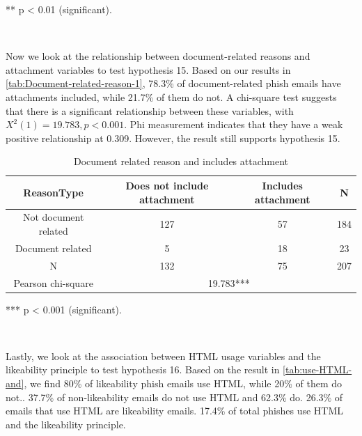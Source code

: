 {*}{*} p < 0.01 (significant).

\ 

Now we look at the relationship between document-related reasons and
attachment variables to test hypothesis 15. Based on our results in
\autoref{tab:Document-related-reason-1}, 78.3\% of document-related
phish emails have attachments included, while 21.7\% of them do not.
A chi-square test suggests that there is a significant relationship
between these variables, with $X^{2}(1)=19.783,p<0.001$. Phi measurement
indicates that they have a weak positive relationship at 0.309. However,
the result still supports hypothesis 15.

\begin{minipage}[t]{1\columnwidth}%
\begin{longtable}{cccc}
\caption{\label{tab:Document-related-reason-1}Document related reason and
includes attachment}
\tabularnewline
\toprule 
{\footnotesize{}ReasonType} & {\footnotesize{}Does not include attachment} & {\footnotesize{}Includes attachment} & \multirow{1}{*}{{\footnotesize{}N}}\tabularnewline
\midrule 
\multirow{1}{*}{{\footnotesize{}Not document related}} & {\footnotesize{}127} & {\footnotesize{}57} & \multirow{1}{*}{{\footnotesize{}184}}\tabularnewline
\midrule 
\multirow{1}{*}{{\footnotesize{}Document related}} & {\footnotesize{}5} & {\footnotesize{}18} & \multirow{1}{*}{{\footnotesize{}23}}\tabularnewline
\midrule 
{\footnotesize{}N} & {\footnotesize{}132} & {\footnotesize{}75} & {\footnotesize{}207}\tabularnewline
\midrule 
{\footnotesize{}Pearson chi-square} & \multicolumn{3}{c}{{\footnotesize{}19.783{*}{*}{*}}}\tabularnewline
\midrule
\end{longtable}%
\end{minipage}

{*}{*}{*} p < 0.001 (significant).

\ 

Lastly, we look at the association between HTML usage variables and
the likeability principle to test hypothesis 16. Based on the result
in \autoref{tab:use-HTML-and}, we find 80\% of likeability phish
emails use HTML, while 20\% of them do not.. 37.7\% of non-likeability
emails do not use HTML and 62.3\% do. 26.3\% of emails that use HTML
are likeability emails. 17.4\% of total phishes use HTML and the likeability
principle.

